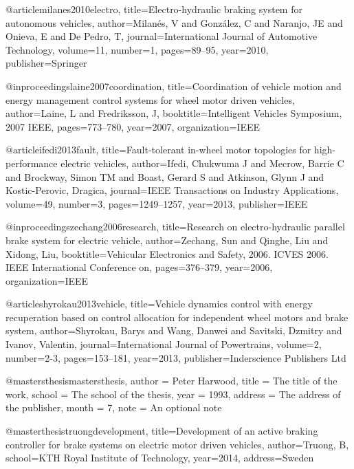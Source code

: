 @article{milanes2010electro,
  title={Electro-hydraulic braking system for autonomous vehicles},
  author={Milan{\'e}s, V and Gonz{\'a}lez, C and Naranjo, JE and Onieva, E and De Pedro, T},
  journal={International Journal of Automotive Technology},
  volume={11},
  number={1},
  pages={89--95},
  year={2010},
  publisher={Springer}
}

@inproceedings{laine2007coordination,
  title={Coordination of vehicle motion and energy management control systems for wheel motor driven vehicles},
  author={Laine, L and Fredriksson, J},
  booktitle={Intelligent Vehicles Symposium, 2007 IEEE},
  pages={773--780},
  year={2007},
  organization={IEEE}
}

@article{ifedi2013fault,
  title={Fault-tolerant in-wheel motor topologies for high-performance electric vehicles},
  author={Ifedi, Chukwuma J and Mecrow, Barrie C and Brockway, Simon TM and Boast, Gerard S and Atkinson, Glynn J and Kostic-Perovic, Dragica},
  journal={IEEE Transactions on Industry Applications},
  volume={49},
  number={3},
  pages={1249--1257},
  year={2013},
  publisher={IEEE}
}

@inproceedings{zechang2006research,
  title={Research on electro-hydraulic parallel brake system for electric vehicle},
  author={Zechang, Sun and Qinghe, Liu and Xidong, Liu},
  booktitle={Vehicular Electronics and Safety, 2006. ICVES 2006. IEEE International Conference on},
  pages={376--379},
  year={2006},
  organization={IEEE}
}

@article{shyrokau2013vehicle,
  title={Vehicle dynamics control with energy recuperation based on control allocation for independent wheel motors and brake system},
  author={Shyrokau, Barys and Wang, Danwei and Savitski, Dzmitry and Ivanov, Valentin},
  journal={International Journal of Powertrains},
  volume={2},
  number={2-3},
  pages={153--181},
  year={2013},
  publisher={Inderscience Publishers Ltd}
}


@mastersthesis{mastersthesis,
  author       = {Peter Harwood}, 
  title        = {The title of the work},
  school       = {The school of the thesis},
  year         = 1993,
  address      = {The address of the publisher},
  month        = 7,
  note         = {An optional note}
}

@masterthesis{truongdevelopment,
  title={Development of an active braking controller for brake systems on electric motor driven vehicles},
  author={Truong, B},
  school={KTH Royal Institute of Technology},
  year={2014},
  address={Sweden}
}

